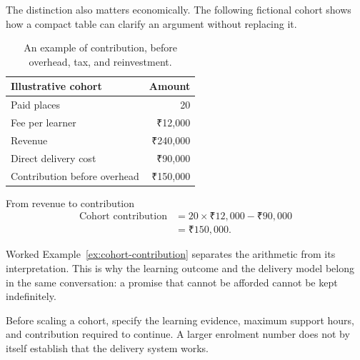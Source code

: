 \documentclass[11pt,twoside,openright]{book}
\begin{document}
The distinction also matters economically. The following fictional cohort
shows how a compact table can clarify an argument without replacing it.

\begin{table}[H]
\centering\small
\begin{tabularx}{\linewidth}{@{}X r@{}}
\toprule
\textbf{Illustrative cohort} & \textbf{Amount}\\
\midrule
Paid places & 20\\
Fee per learner & ₹12,000\\
Revenue & ₹240,000\\
Direct delivery cost & ₹90,000\\
\midrule
Contribution before overhead & ₹150,000\\
\bottomrule
\end{tabularx}
\caption{An example of contribution, before overhead, tax, and reinvestment.}
\end{table}

\begin{WorkedExample}{From revenue to contribution}
\label{ex:cohort-contribution}
\begin{equation}
\begin{aligned}
\text{Cohort contribution} &= 20\times\text{₹}12,000-\text{₹}90,000\\
&=\text{₹}150,000.
\end{aligned}
\end{equation}

\end{WorkedExample}

Worked Example~\ref{ex:cohort-contribution} separates the arithmetic from its
interpretation. This is why the learning outcome and the delivery model belong in the same
conversation: a promise that cannot be afforded cannot be kept indefinitely.

Before scaling a cohort, specify the learning evidence, maximum support hours,
and contribution required to continue. A larger enrolment number does not by
itself establish that the delivery system works.
\end{document}

